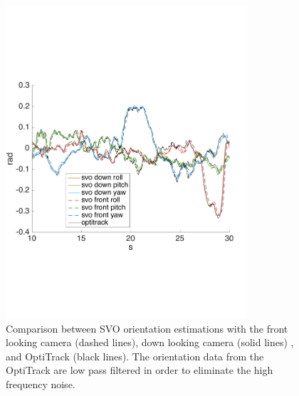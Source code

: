 \begin{figure}[!ht]
    \centering
    \includegraphics[width=0.8\textwidth]{img/comparision_between_two_svo_and_opti_angles.pdf}
    \caption{Comparison between SVO orientation estimations with the front looking camera (dashed lines), down looking camera (solid lines) , and OptiTrack (black lines). The orientation data from the OptiTrack are low pass filtered in order to eliminate the high frequency noise.}
    \label{fig:comparision_svo_angles}
\end{figure}

